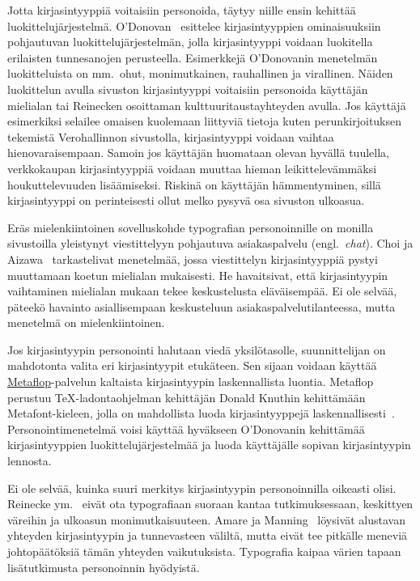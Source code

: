 \documentclass[finnish, 12pt, a4paper, elec, utf8, a-1b, online]{aaltothesis}
\begin{document}
Jotta kirjasintyyppiä voitaisiin personoida, täytyy niille ensin kehittää
luokittelujärjestelmä. O'Donovan~\cite{odonovan_2015} esittelee kirjasintyyppien
ominaisuuksiin pohjautuvan luokittelujärjestelmän, jolla kirjasintyyppi voidaan
luokitella erilaisten tunnesanojen perusteella. Esimerkkejä O'Donovanin
menetelmän luokitteluista on mm.~ohut, monimutkainen, rauhallinen ja virallinen.
Näiden luokittelun avulla sivuston kirjasintyyppi voitaisiin personoida
käyttäjän mielialan tai Reinecken osoittaman kulttuuritaustayhteyden avulla. Jos
käyttäjä esimerkiksi selailee omaisen kuolemaan liittyviä tietoja kuten
perunkirjoituksen tekemistä Verohallinnon sivustolla, kirjasintyyppi voidaan
vaihtaa hienovaraisempaan. Samoin jos käyttäjän huomataan olevan hyvällä
tuulella, verkkokaupan kirjasintyyppiä voidaan muuttaa hieman leikittelevämmäksi
houkuttelevuuden lisäämiseksi. Riskinä on käyttäjän hämmentyminen, sillä
kirjasintyyppi on perinteisesti ollut melko pysyvä osa sivuston ulkoasua.

Eräs mielenkiintoinen sovelluskohde typografian personoinnille on monilla
sivustoilla yleistynyt viestittelyyn pohjautuva asiakaspalvelu
(engl.~\textit{chat}). Choi ja Aizawa~\cite{choi_aizawa_2018} tarkastelivat
menetelmää, jossa viestittelyn kirjasintyyppiä pystyi muuttamaan koetun
mielialan mukaisesti. He havaitsivat, että kirjasintyypin vaihtaminen mielialan
mukaan tekee keskustelusta eläväisempää. Ei ole selvää, päteekö havainto
asiallisempaan keskusteluun asiakaspalvelutilanteessa, mutta menetelmä on
mielenkiintoinen.

Jos kirjasintyypin personointi halutaan viedä yksilötasolle, suunnittelijan on
mahdotonta valita eri kirjasintyypit etukäteen. Sen sijaan voidaan käyttää
\href{https://www.metaflop.com/}{Metaflop}-palvelun kaltaista kirjasintyypin
laskennallista luontia. Metaflop perustuu TeX-ladontaohjelman kehittäjän Donald
Knuthin kehittämään Metafont-kieleen, jolla on mahdollista luoda
kirjasintyyppejä laskennallisesti~\cite{knuth_1986}. Personointimenetelmä voisi
käyttää hyväkseen O'Donovanin kehittämää kirjasintyyppien luokittelujärjestelmää
ja luoda käyttäjälle sopivan kirjasintyypin lennosta.

Ei ole selvää, kuinka suuri merkitys kirjasintyypin personoinnilla oikeasti
olisi. Reinecke ym.~\cite{10.1145/2556288.2557052} eivät ota typografiaan
suoraan kantaa tutkimuksessaan, keskittyen väreihin ja ulkoasun
monimutkaisuuteen. Amare ja Manning~\cite{10.1109/IPCC.2012.6408605} löysivät
alustavan yhteyden kirjasintyypin ja tunnevasteen väliltä, mutta eivät tee
pitkälle meneviä johtopäätöksiä tämän yhteyden vaikutuksista. Typografia kaipaa
värien tapaan lisätutkimusta personoinnin hyödyistä.
\end{document}

